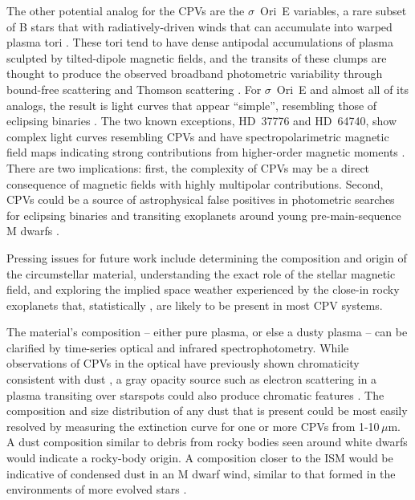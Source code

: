 \documentclass{nature3}
\begin{document}
The other potential analog for the CPVs are the $\sigma$~Ori~E
variables, a rare subset of B stars that with radiatively-driven winds
that can accumulate into
warped plasma tori \cite{Townsend2005,Townsend2008}.  These tori tend
to have dense antipodal accumulations of plasma sculpted by
tilted-dipole magnetic fields, and the transits of
these clumps are thought to produce the observed broadband photometric variability
through bound-free scattering \cite{Townsend2005} and
Thomson scattering \cite{Berry2022}.  For $\sigma$~Ori~E and almost
all of its analogs, the result is light curves that appear ``simple'',
resembling those of eclipsing binaries \cite{Townsend2008}.  The two known
exceptions, HD~37776 and HD~64740, show complex light curves
resembling CPVs \cite{Mikulasek2020,Bouma2024} and have
spectropolarimetric magnetic field maps indicating strong
contributions from higher-order magnetic moments
\cite{Kochukhov2011,Shultz2018}.  There are two implications: first,
the complexity of CPVs may be a direct consequence of magnetic fields
with highly multipolar contributions.  Second, CPVs could be a
source of astrophysical false positives in photometric searches for
eclipsing binaries and transiting exoplanets around young
pre-main-sequence M dwarfs \cite{Johns-Krull2016,Bouma2020}.

Pressing issues for future work include determining the composition
and origin of the circumstellar material, understanding the exact role
of the stellar magnetic field, and exploring the implied space weather
experienced by the close-in rocky exoplanets that, statistically
\cite{Dressing2015}, are likely to be present in most CPV systems.

The material's composition -- either pure plasma, or else a dusty
plasma -- can be clarified by time-series optical and infrared
spectrophotometry.  While observations of CPVs in the optical have
previously shown chromaticity consistent with dust \cite{Tanimoto2020,Gunther2022,Koen2023},
a gray opacity source such as electron scattering in a plasma
transiting over starspots could also produce chromatic features
\cite{Rackham2018}.  The composition and size distribution of any dust
that is present could be most easily resolved by measuring the
extinction curve for one or more CPVs from 1-10\,$\mu$m.  A
dust composition similar to debris from rocky bodies seen around white
dwarfs \cite{Reach2009} would indicate a rocky-body origin.  A 
composition closer to the ISM would be indicative of condensed dust in
an M dwarf wind, similar to that formed in the environments of more
evolved stars \cite{Marigo2008}.
\end{document}
